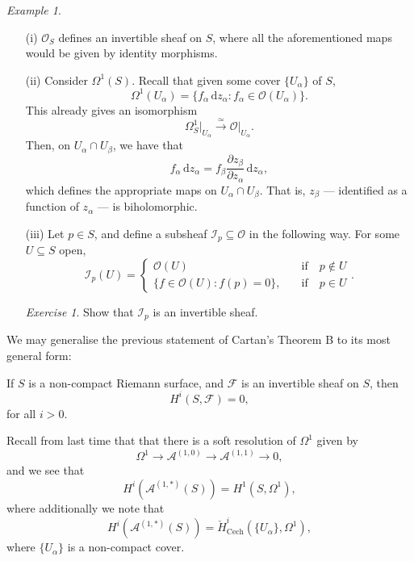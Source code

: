 \documentclass[a4paper]{report}
\theoremstyle{definition}
\theoremstyle{remark}
\theoremstyle{proposition}
\theoremstyle{conjecture}
\theoremstyle{lemma}
\theoremstyle{corollary}
\theoremstyle{exercise}
\newtheorem{exercise}{Exercise}
\theoremstyle{example}
\newtheorem{example}{Example}
\newcommand{\mcal}{\mathcal}
\newcommand{\diff}{\,\mathrm{d}}
\newcommand{\on}{\operatorname}
\begin{document}
\begin{example}
    \begin{itemize}
        \item[(i)] $\mcal{O}_S$ defines an invertible sheaf on $S$, where 
            all the aforementioned maps would be given by identity morphisms.
        \item[(ii)] Consider $\Omega^1(S)$. Recall
            that given some cover $\lbrace U_\alpha\rbrace$ of $S$,
            $$\Omega^1(U_\alpha) = \lbrace f_\alpha \diff z_\alpha: f_\alpha \in \mcal{O}(U_\alpha)\rbrace.$$
            This already gives an isomorphism
            $$\Omega^1_S\vert_{U_\alpha} \stackrel{\simeq}{\longrightarrow} \mcal{O}\vert_{U_\alpha}.$$
            Then, on $U_\alpha \cap U_\beta$, we have that 
            $$f_\alpha \diff z_\alpha = f_\beta \frac{\partial z_\beta}{\partial z_\alpha}\diff z_\alpha,$$
            which defines the appropriate maps on $U_\alpha \cap U_\beta$.
            That is, $z_\beta$ --- identified as a function of $z_\alpha$ ---
            is biholomorphic.
        \item[(iii)] Let $p\in S$, and define a subsheaf 
            $\mcal{I}_p\subseteq \mcal{O}$ in the following way.
            For some $U\subseteq S$ open, 
            $$\mcal{I}_p(U) = \begin{cases}
                \mcal{O}(U) \quad &\text{if}\quad p\not\in U\\
                \lbrace f\in \mcal{O}(U) : f(p) = 0\rbrace, \quad &\text{if}\quad p \in U
            \end{cases}.$$
            \begin{exercise}
                Show that $\mcal{I}_p$ is an invertible sheaf.
            \end{exercise}
    \end{itemize}
\end{example}

We may generalise the previous statement of Cartan's Theorem B to 
its most general form:

\begin{theorem}\label{thm_cartan_thm_b_general}
    If $S$ is a non-compact Riemann surface, and $\mcal{F}$ is an invertible
    sheaf on $S$, then
    $$H^i(S,\mcal{F}) = 0,$$
    for all $i > 0$.
\end{theorem}

Recall from last time that that there is a soft resolution of $\Omega^1$
given by 
$$\Omega^1 \longrightarrow \mcal{A}^{(1,0)} \longrightarrow \mcal{A}^{(1,1)}\longrightarrow 0,$$
and we see that 
$$H^i(\mcal{A}^{(1,\ast)}(S)) = H^1(S,\Omega^1),$$
where additionally we note that 
$$H^i(\mcal{A}^{(1,\ast)}(S)) = \check{H}^i_{\on{Cech}}(\lbrace U_\alpha\rbrace,\Omega^1),$$
where $\lbrace U_\alpha\rbrace$ is a non-compact cover.
\end{document}
